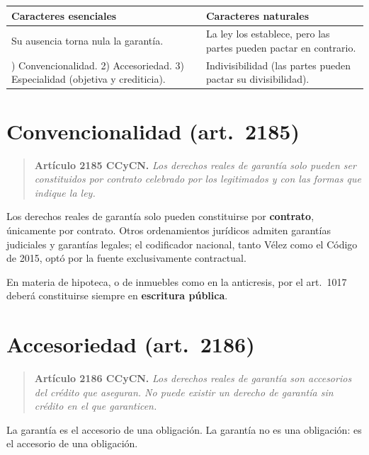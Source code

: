 \documentclass[12pt,oneside]{book}
\begin{document}
\begin{table}[H]
\centering
\begin{tabularx}{\textwidth}{L L}
\toprule
\textbf{Caracteres esenciales} & \textbf{Caracteres naturales} \\
\midrule
Su ausencia torna nula la garantía. &
La ley los establece, pero las partes pueden pactar en contrario. \\
) Convencionalidad. 2) Accesoriedad. 3) Especialidad (objetiva y crediticia). &
Indivisibilidad (las partes pueden pactar su divisibilidad). \\
\bottomrule
\end{tabularx}
\end{table}

\section{Convencionalidad (art.~2185)}

\begin{quote}
\textbf{Artículo 2185 CCyCN.} \textit{Los derechos reales de garantía solo pueden ser constituidos por contrato celebrado por los legitimados y con las formas que indique la ley.}
\end{quote}

Los derechos reales de garantía solo pueden constituirse por \textbf{contrato}, únicamente por contrato. Otros ordenamientos jurídicos admiten garantías judiciales y garantías legales; el codificador nacional, tanto Vélez como el Código de 2015, optó por la fuente exclusivamente contractual.

En materia de hipoteca, o de inmuebles como en la anticresis, por el art.~1017 deberá constituirse siempre en \textbf{escritura pública}.

\section{Accesoriedad (art.~2186)}

\begin{quote}
\textbf{Artículo 2186 CCyCN.} \textit{Los derechos reales de garantía son accesorios del crédito que aseguran. No puede existir un derecho de garantía sin crédito en el que garanticen.}
\end{quote}

\begin{important}
La garantía es el accesorio de una obligación. La garantía no es una obligación: es el accesorio de una obligación.
\end{important}
\end{document}
